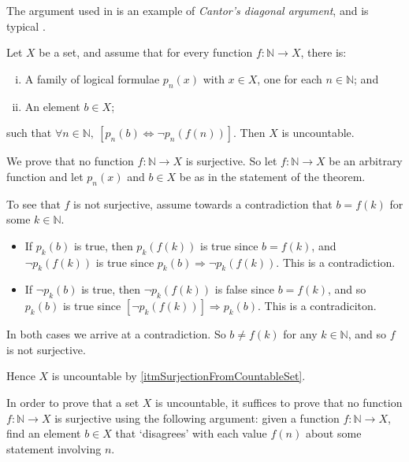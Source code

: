 The argument used in  is an example of \textit{Cantor's diagonal argument}, and is typical .

\begin{theorem}
\label{thmCantorDiagonalGeneral}
Let $X$ be a set, and assume that for every function $f : \mathbb{N} \to X$, there is:
\begin{enumerate}[(i)]
\item A family of logical formulae $p_n(x)$ with $x \in X$, one for each $n \in \mathbb{N}$; and
\item An element $b \in X$;
\end{enumerate}
such that $\forall n \in \mathbb{N},~ [p_n(b) \Leftrightarrow \neg p_n(f(n))]$. Then $X$ is uncountable.
\end{theorem}

\begin{cproof}
We prove that no function $f : \mathbb{N} \to X$ is surjective. So let $f : \mathbb{N} \to X$ be an arbitrary function and let $p_n(x)$ and $b \in X$ be as in the statement of the theorem.

To see that $f$ is not surjective, assume towards a contradiction that $b=f(k)$ for some $k \in \mathbb{N}$.
\begin{itemize}
\item If $p_k(b)$ is true, then $p_k(f(k))$ is true since $b=f(k)$, and $\neg p_k(f(k))$ is true since $p_k(b) \Rightarrow \neg p_k(f(k))$. This is a contradiction.
\item If $\neg p_k(b)$ is true, then $\neg p_k(f(k))$ is false since $b=f(k)$, and so $p_k(b)$ is true since $[\neg p_k(f(k))] \Rightarrow p_k(b)$. This is a contradiciton. 
\end{itemize}
In both cases we arrive at a contradiction. So $b \ne f(k)$ for any $k \in \mathbb{N}$, and so $f$ is not surjective.

Hence $X$ is uncountable by \ref{itmSurjectionFromCountableSet}.
\end{cproof}

\begin{strategy}
\label{strCantorDiagonal}
In order to prove that a set $X$ is uncountable, it suffices to prove that no function $f : \mathbb{N} \to X$ is surjective using the following argument: given a function $f : \mathbb{N} \to X$, find an element $b \in X$ that `disagrees' with each value $f(n)$ about some statement involving $n$.
\end{strategy}

